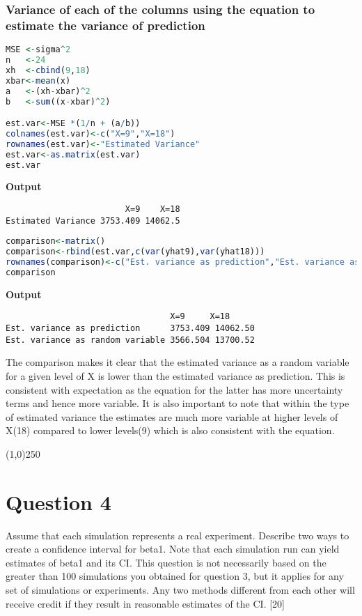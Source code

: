 \documentclass[a4paper]{article}
\begin{document}
\subsubsection{Variance of each of the columns using the equation to estimate the variance of prediction}

\begin{lstlisting}[language=R]
MSE <-sigma^2
n   <-24
xh  <-cbind(9,18)
xbar<-mean(x)
a   <-(xh-xbar)^2
b   <-sum((x-xbar)^2)

est.var<-MSE *(1/n + (a/b)) 
colnames(est.var)<-c("X=9","X=18")
rownames(est.var)<-"Estimated Variance"
est.var<-as.matrix(est.var)
est.var
\end{lstlisting}
\textbf{Output}
\begin{lstlisting}
                        X=9    X=18
Estimated Variance 3753.409 14062.5
\end{lstlisting}

\begin{lstlisting}[language=R]
comparison<-matrix()
comparison<-rbind(est.var,c(var(yhat9),var(yhat18)))
rownames(comparison)<-c("Est. variance as prediction","Est. variance as random variable")
comparison
\end{lstlisting}
\textbf{Output}
\linebreak
\linebreak
\begin{lstlisting}
                     		     X=9     X=18
Est. variance as prediction      3753.409 14062.50
Est. variance as random variable 3566.504 13700.52

\end{lstlisting}
The comparison makes it clear that the estimated variance as a random variable for a given level of X is lower than the estimated variance as prediction. This is consistent with expectation as the equation for the latter has more uncertainty terms and hence more variable. It is also important to note that within the type of estimated variance the estimates are much more variable at higher levels of X(18) compared to lower levels(9) which is also consistent with the equation.
\begin{center}
\line(1,0){250}
\end{center}
\pagebreak
\section{Question 4}
Assume that each simulation represents a real experiment. Describe two ways to create a confidence interval for beta1. Note that each simulation run can yield estimates of beta1 and its CI. This question is not necessarily based on the greater than 100 simulations you obtained for question 3, but it applies for any set of simulations or experiments. Any two methods different from each other will receive credit if they result in reasonable estimates of the CI. [20]
\end{document}
